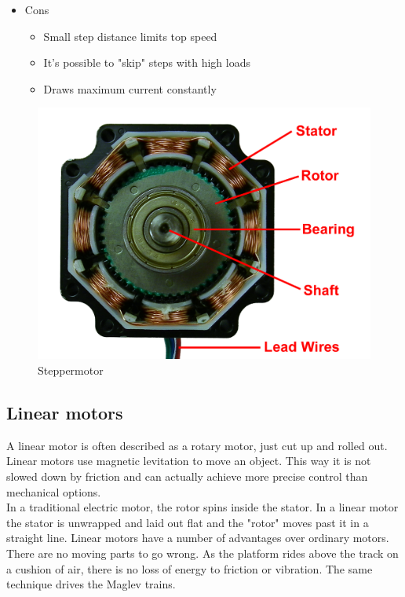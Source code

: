 \documentclass[11pt]{article}
\begin{document}
 				
\begin{itemize}		
\item Cons
\begin{itemize}
		\item Small step distance limits top speed
		\item    It's possible to "skip" steps with high loads
		\item    Draws maximum current constantly
	
	\end{itemize}		
\end{itemize}	
\begin{figure}[hbtp]
\caption{Steppermotor}
\centering
\includegraphics[scale=0.15]{build/Steppermotor.png}
\end{figure}

\newpage
\subsection{Linear motors }


A linear motor is often described as a rotary motor, just cut up and rolled out. Linear motors use magnetic levitation to move an object. This way it is not slowed down by friction and can actually achieve more precise control than mechanical options.\\

In a traditional electric motor, the rotor spins inside the stator. In a linear motor the stator is unwrapped and laid out flat and the "rotor" moves past it in a straight line. Linear motors have a number of advantages over ordinary motors. There are no moving parts to go wrong. As the platform rides above the track on a cushion of air, there is no loss of energy to friction or vibration. The same technique drives the Maglev trains.  
\end{document}
